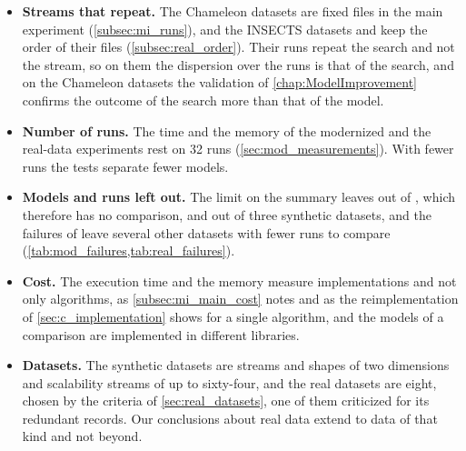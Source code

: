 \begin{itemize}
    \item \textbf{Streams that repeat.} The Chameleon datasets are fixed files in the main experiment (\cref{subsec:mi_runs}), and the INSECTS datasets and \Covertype keep the order of their files (\cref{subsec:real_order}). Their runs repeat the search and not the stream, so on them the dispersion over the runs is that of the search, and on the Chameleon datasets the validation of \cref{chap:ModelImprovement} confirms the outcome of the search more than that of the model.
    \item \textbf{Number of runs.} The time and the memory of the modernized and the real-data experiments rest on 32 runs (\cref{sec:mod_measurements}). With fewer runs the tests separate fewer models.
    \item \textbf{Models and runs left out.} The limit on the summary leaves \MicroTEDAClusPlus out of \Covertype, which therefore has no comparison, and \BIRCH out of three synthetic datasets, and the failures of \BIRCH leave several other datasets with fewer runs to compare (\cref{tab:mod_failures,tab:real_failures}).
    \item \textbf{Cost.} The execution time and the memory measure implementations and not only algorithms, as \cref{subsec:mi_main_cost} notes and as the reimplementation of \cref{sec:c_implementation} shows for a single algorithm, and the models of a comparison are implemented in different libraries.
    \item \textbf{Datasets.} The synthetic datasets are streams and shapes of two dimensions and scalability streams of up to sixty-four, and the real datasets are eight, chosen by the criteria of \cref{sec:real_datasets}, one of them criticized for its redundant records. Our conclusions about real data extend to data of that kind and not beyond.
\end{itemize}

\clearpage
